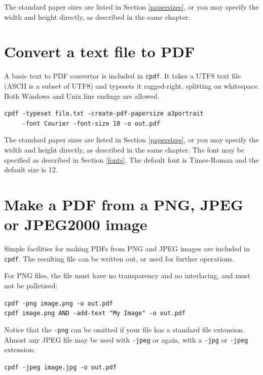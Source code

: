 \documentclass{book}
\begin{document}
\noindent The standard paper sizes are listed in Section \ref{papersizes}, or you may specify the width and height directly, as described in the same chapter.

\section{Convert a text file to PDF}
A basic text to PDF convertor is included in \texttt{cpdf}. It takes a UTF8 text file (ASCII is a subset of UTF8) and typesets it ragged-right, splitting on whitespace. Both Windows and Unix line endings are allowed. 

\begin{framed}
 \noindent\small\verb?cpdf -typeset file.txt -create-pdf-papersize a3portrait?\\
 \noindent\small\verb?     -font Courier -font-size 10 -o out.pdf?
\end{framed}

\noindent The standard paper sizes are listed in Section \ref{papersizes}, or you may specify the width and height directly, as described in the same chapter. The font may be specified as described in Section \ref{fonts}. The default font is Times-Roman and the default size is 12.

\section{Make a PDF from a PNG, JPEG or JPEG2000 image}

Simple facilities for making PDFs from PNG and JPEG images are included in \texttt{cpdf}. The resulting file can be written out, or used for further operations.

For PNG files, the file must have no transparency and no interlacing, and must not be palletised:

\begin{framed}
 \noindent\small\verb?cpdf -png image.png -o out.pdf?\\
 \noindent\small\verb?cpdf image.png AND -add-text "My Image" -o out.pdf?
\end{framed}

\noindent Notice that the \texttt{-png} can be omitted if your file has a standard file extension. Almost any JPEG file may be used with \texttt{-jpeg} or again, with a \texttt{-jpg} or \texttt{-jpeg} extension:

\begin{framed}
 \noindent\small\verb?cpdf -jpeg image.jpg -o out.pdf?
\end{framed}
\end{document}

